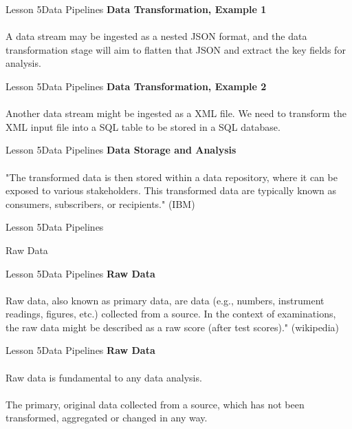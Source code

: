 \documentclass[aspectratio=1610]{beamer}
\begin{document}
\begin{frame}{Lesson 5}{Data Pipelines}
\LARGE
\textbf{Data Transformation, Example 1}\\~\\
A data stream may be ingested as a nested JSON format, and the data 
transformation stage will aim to flatten that JSON and extract the
key fields for analysis.
\end{frame}


\begin{frame}{Lesson 5}{Data Pipelines}
\LARGE
\textbf{Data Transformation, Example 2}\\~\\
Another data stream might be ingested as a XML file. We need to 
transform the XML input file into a SQL table to be stored in a SQL
database.
\end{frame}



\begin{frame}{Lesson 5}{Data Pipelines}
\LARGE
\textbf{Data Storage and Analysis}\\~\\
"The transformed data is then stored within a data repository, where
it can be exposed to various stakeholders. This transformed data are
typically known as consumers, subscribers, or recipients." (IBM)
\end{frame}



\begin{frame}{Lesson 5}{Data Pipelines}
\Huge
\begin{center}
Raw Data
\end{center}
\end{frame}


\begin{frame}{Lesson 5}{Data Pipelines}
\LARGE
\textbf{Raw Data}\\~\\
Raw data, also known as primary data, are data (e.g., numbers, 
instrument readings, figures, etc.) collected from a source. In the 
context of examinations, the raw data might be described as a raw 
score (after test scores)." (wikipedia)
\end{frame}



\begin{frame}{Lesson 5}{Data Pipelines}
\LARGE
\textbf{Raw Data}\\~\\
Raw data is fundamental to any data analysis.\\~\\
The primary, original data collected from a source, which has not
been transformed, aggregated or changed in any way.
\end{frame}
\end{document}
